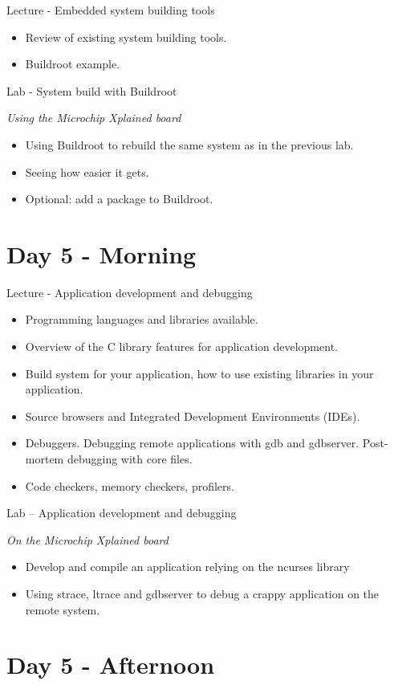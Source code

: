 \documentclass[a4paper,12pt,obeyspaces,spaces,hyphens]{article}
\begin{document}
\feagendatwocolumn
{Lecture - Embedded system building tools}
{
  \begin{itemize}
  \item Review of existing system building tools.
  \item Buildroot example.
  \end{itemize}
}
{Lab - System build with Buildroot}
{
  {\em Using the Microchip Xplained board}
  \begin{itemize}
  \item Using Buildroot to rebuild the same system as in the previous lab.
  \item Seeing how easier it gets.
  \item Optional: add a package to Buildroot.
  \end{itemize}
}

\section{Day 5 - Morning}

\feagendaonecolumn
{Lecture - Application development and debugging}
{
  \begin{itemize}
  \item Programming languages and libraries available.
  \item Overview of the C library features for application development.
  \item Build system for your application,
        how to use existing libraries in your application.
  \item Source browsers and Integrated Development Environments (IDEs).
  \item Debuggers. Debugging remote applications with gdb and gdbserver.
        Post-mortem debugging with core files.
  \item Code checkers, memory checkers, profilers.
  \end{itemize}
}

\feagendaonecolumn
{Lab – Application development and debugging}
{
  {\em On the Microchip Xplained board}
  \begin{itemize}
  \item Develop and compile an application relying on the ncurses library
  \item Using strace, ltrace and gdbserver to debug a crappy application
        on the remote system.
  \end{itemize}
}


\section{Day 5 - Afternoon}
\end{document}

